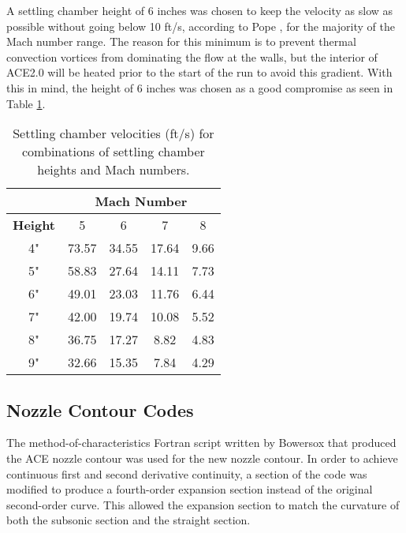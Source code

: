 A settling chamber height of 6 inches was chosen to keep the velocity as slow as possible without going below 10 ft/s, according to Pope \cite{pope}, for the majority of the Mach number range. The reason for this minimum is to prevent thermal convection vortices from dominating the flow at the walls, but the interior of ACE2.0 will be heated prior to the start of the run to avoid this gradient. With this in mind, the height of 6 inches was chosen as a good compromise as seen in Table \ref{tab:sc_vel}.

\begin{table}[ht!]
    \centering
    \begin{tabular}{|c|c|c|c|c|}
        \cline{2-5}
        \multicolumn{1}{c}{} & \multicolumn{4}{|c|}{\textbf{Mach Number}} \\ \hline
        \textbf{Height} & 5 & 6 & 7 & 8 \\ \hline
        4" & 73.57 & 34.55 & 17.64 & 9.66 \\ \hline
        5" & 58.83 & 27.64 & 14.11 & 7.73 \\ \hline \hline
        6" & 49.01 & 23.03 & 11.76 & 6.44 \\ \hline \hline
        7" & 42.00 & 19.74 & 10.08 & 5.52 \\ \hline
        8" & 36.75 & 17.27 & 8.82 & 4.83 \\ \hline
        9" & 32.66 & 15.35 & 7.84 & 4.29 \\ \hline
    \end{tabular}
    \caption{Settling chamber velocities (ft/s) for combinations of settling chamber heights and Mach numbers.}
    \label{tab:sc_vel}
\end{table}
    
\subsection{Nozzle Contour Codes}

The method-of-characteristics Fortran script written by Bowersox that produced the ACE nozzle contour was used for the new nozzle contour. In order to achieve continuous first and second derivative continuity, a section of the code was modified to produce a fourth-order expansion section instead of the original second-order curve. This allowed the expansion section to match the curvature of both the subsonic section and the straight section.

